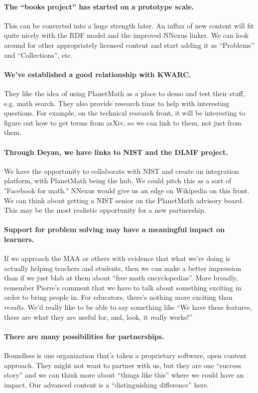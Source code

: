 \paragraph{The ``books project'' has started on a prototype scale.}  This
can be converted into a huge strength later.  An influx of new content
will fit quite nicely with the RDF model and the improved NNexus
linker.  We can look around for other appropriately licensed content
and start adding it as ``Problems'' and ``Collections'', etc.

\paragraph{We've established a good relationship with KWARC.} They like the
idea of using PlanetMath as a place to demo and test their stuff,
e.g. math search.  They also provide research time to help with
interesting questions.  For example, on the technical research front,
it will be interesting to figure out how to get terms from arXiv, so
we can link to them, not just from them.

\paragraph{Through Deyan, we have links to NIST and the DLMF project.}  We
have the opportunity to collaborate with NIST and create an
integration platform, with PlanetMath being the hub.  We could pitch
this as a sort of "Facebook for math."  NNexus would give us an edge
on Wikipedia on this front.  We can think about getting a NIST senior
on the PlanetMath advisory board.  This may be the most realistic
opportunity for a new partnership.

\paragraph{Support for problem solving may have a meaningful impact on learners.}
If we approach the MAA or others with evidence that what
we're doing is actually helping teachers and students, then we can make
a better impression than if we just blab at them about ``free math
encyclopedias''.  More broadly, remember Pierre's comment that we have to talk
about something exciting in order to bring people in.  For educators, there's nothing more exciting than \emph{results}.  We'd really like to be able to 
say something like ``We have these features, these are what they are
useful for, and, look, it really works!''

\paragraph{There are many possibilities for partnerships.}  Boundless is one
organization that's taken a proprietary software, open content
approach.  They might not want to partner with us, but they are one
``success story'' and we can think more about ``things like this''
where we could have an impact.  Our advanced content is a
``distinguishing difference'' here.

